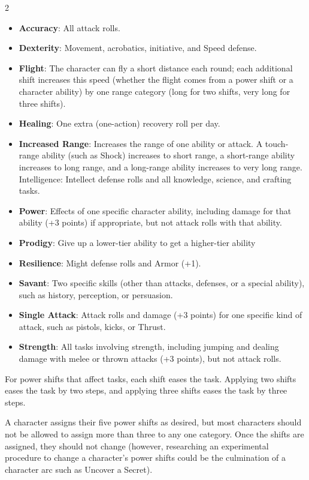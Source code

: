 \begin{multicols}{2}
\begin{itemize}
\item \textbf{Accuracy}: All attack rolls.
\item \textbf{Dexterity}: Movement, acrobatics, initiative, and Speed defense.
\item \textbf{Flight}: The character can fly a short distance each round; each additional shift increases this speed (whether the flight comes from a power shift or a character ability) by one range category (long for two shifts, very long for three shifts).
\item \textbf{Healing}: One extra (one-action) recovery roll per day.
\item \textbf{Increased Range}: Increases the range of one ability or attack. A touch-range ability (such as Shock) increases to short range, a short-range ability increases to long range, and a long-range ability increases to very long range.
Intelligence: Intellect defense rolls and all knowledge, science, and crafting tasks.
\item \textbf{Power}: Effects of one specific character ability, including damage for that ability (+3 points) if appropriate, but not attack rolls with that ability.
\item \textbf{Prodigy}: Give up a lower-tier ability to get a higher-tier ability
\item \textbf{Resilience}: Might defense rolls and Armor (+1).
\item \textbf{Savant}: Two specific skills (other than attacks, defenses, or a special ability), such as history, perception, or persuasion.
\item \textbf{Single Attack}: Attack rolls and damage (+3 points) for one specific kind of attack, such as pistols, kicks, or Thrust.
\item \textbf{Strength}: All tasks involving strength, including jumping and dealing damage with melee or thrown attacks (+3 points), but not attack rolls.
\end{itemize}

For power shifts that affect tasks, each shift eases the task. Applying two shifts eases the task by two steps, and applying three shifts eases the task by three steps.

A character assigns their five power shifts as desired, but most characters should not be allowed to assign more than three to any one category. Once the shifts are assigned, they should not change (however, researching an experimental procedure to change a character’s power shifts could be the culmination of a character arc such as Uncover a Secret).


\end{multicols}
